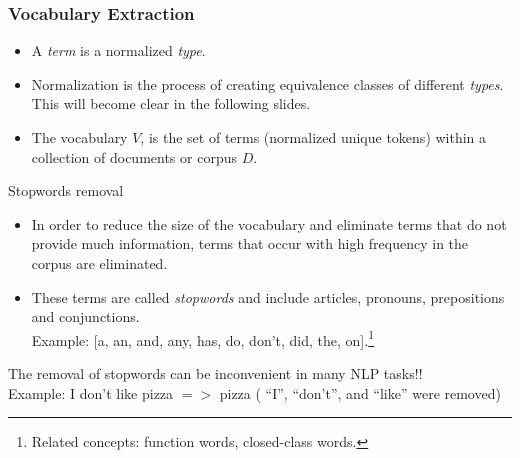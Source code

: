 \documentclass[handout]{beamer}
\begin{document}
\begin{frame}\frametitle{Vocabulary Extraction }
\footnotesize{
\begin{itemize}
 \item A  \emph{term} is a normalized \emph{type}. 
 \item Normalization is the process of creating equivalence classes of different \emph{types}. This will become clear in the following slides.
 \item The vocabulary $V$, is the set of terms (normalized unique tokens) within a collection of documents or corpus $D$.
\end{itemize}
 
\begin{block}{Stopwords removal}
\begin{itemize}
 \item In order to reduce the size of the vocabulary and eliminate terms that do not provide much information, terms that occur with high frequency in the corpus are eliminated. 
 \item These terms are called \emph{stopwords} and include  articles, pronouns, prepositions and conjunctions. \\
Example: [a, an, and, any, has, do, don't, did, the, on].\footnote{Related concepts: function words, closed-class words.}
\end{itemize}

The removal of stopwords can be inconvenient in many NLP tasks!! 
\\ Example: I don't like pizza $=>$ pizza  ( ``I'', ``don't'', and ``like'' were removed)

\end{block}


}
 
\end{frame}
\end{document}
